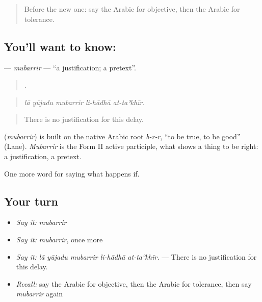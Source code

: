 \label{lesson:AR-C422-mubarrir}



\begin{quote}
Before the new one: say the Arabic for objective, then the Arabic for tolerance.
\end{quote}

\subsection*{You'll want to know: }
\textbf{} — \emph{mubarrir} — \textquotedblleft{}a justification; a pretext\textquotedblright{}.

\begin{quote}
    .
\end{quote}

\begin{quote}
\emph{lā yūjadu mubarrir li-hādhā at-taʾkhīr.}
\end{quote}

\begin{quote}
There is no justification for this delay.
\end{quote}

\begin{cousinweb}
\textbf{} (\emph{mubarrir}) is built on the native Arabic root \emph{b-r-r}, \textquotedblleft{}to be true, to be good\textquotedblright{} (Lane). \emph{Mubarrir} is the Form II active participle, what shows a thing to be right: a justification, a pretext.
\end{cousinweb}

\begin{grammarlens}[title={What you've built}]
One more word for saying what happens if.
\end{grammarlens}

\subsection*{Your turn}
\begin{itemize}
\raggedright
  \item \emph{Say it:} \emph{mubarrir}
  \item \emph{Say it:} \emph{mubarrir}, once more
  \item \emph{Say it:} \emph{lā yūjadu mubarrir li-hādhā at-taʾkhīr.} — There is no justification for this delay.
  \item \emph{Recall:} say the Arabic for objective, then the Arabic for tolerance, then say \emph{mubarrir} again
\end{itemize}

